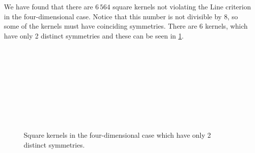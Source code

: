 \begin{observation}
We have found that there are $6\,564$ square kernels not violating the Line criterion  in the four-dimensional case. Notice that this number is not divisible by $8$, so some of the kernels must have coinciding symmetries. There are 6 kernels, which have only 2 distinct symmetries and these can be seen in \cref{fig:4d-square-self-two-symmetric-kernels}.

\begin{figure}[ht]
    \centering
    \begin{subfigure}[b]{0.14\textwidth}
        \centering
        \begin{tikzpicture}[scale=0.07]
            
        \end{tikzpicture}
    \end{subfigure}
    ~
    \begin{subfigure}[b]{0.14\textwidth}
        \centering
        \begin{tikzpicture}[scale=0.07]
            
        \end{tikzpicture}
    \end{subfigure}
    ~
    \begin{subfigure}[b]{0.14\textwidth}
        \centering
        \begin{tikzpicture}[scale=0.07]
            
        \end{tikzpicture}
    \end{subfigure}
    ~
    \begin{subfigure}[b]{0.14\textwidth}
        \centering
        \begin{tikzpicture}[scale=0.07]
            
        \end{tikzpicture}
    \end{subfigure}
    ~
    \begin{subfigure}[b]{0.14\textwidth}
        \centering
        \begin{tikzpicture}[scale=0.07]
            
        \end{tikzpicture}
    \end{subfigure}
    ~
    \begin{subfigure}[b]{0.14\textwidth}
        \centering
        \begin{tikzpicture}[scale=0.07]
            
        \end{tikzpicture}
    \end{subfigure}
    \caption{Square kernels in the four-dimensional case which have only 2 distinct symmetries.}
    \label{fig:4d-square-self-two-symmetric-kernels}
\end{figure}


\end{observation}
